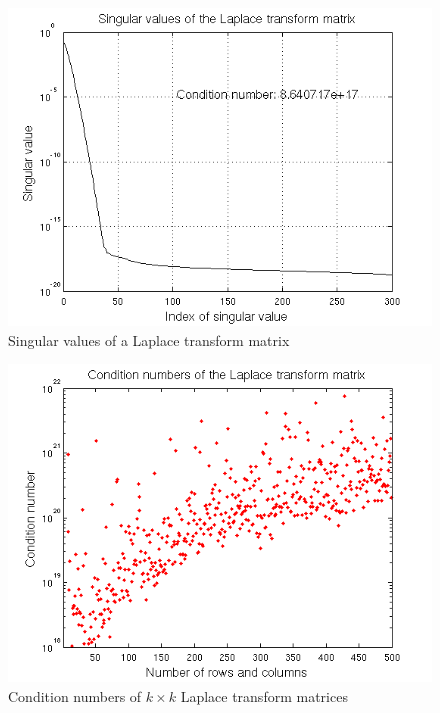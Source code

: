 \documentclass[12pt,a4]{article}
\begin{document}
\begin{figure}[t]
\begin{center}
\includegraphics[scale=.6]{img/singular.png}
\end{center}
\caption{Singular values of a Laplace transform matrix}
\label{fig:singular}
\end{figure}

\begin{figure}[t]
\begin{center}
\includegraphics[scale=.6]{img/cond.png}
\end{center}
\caption{Condition numbers of $k \times k$ Laplace transform matrices}
\label{fig:cond}
\end{figure}
\end{document}
